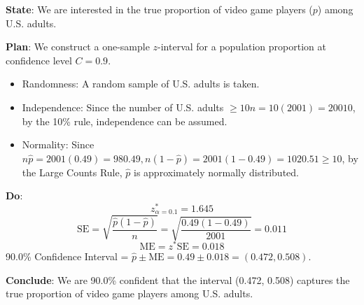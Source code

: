 \documentclass{article}
\begin{document}
\textbf{State}: We are interested in the true proportion of video game players (\(p\)) among U.S. adults.
\newline

\textbf{Plan}: We construct a one-sample \(z\)-interval for a population proportion at confidence level \(C = 0.9\).
\begin{itemize}
\item    Randomness: A random sample of U.S. adults is taken.

\item    Independence: Since the number of U.S. adults \(\geq 10n= 10(2001) = 20010\), by the 10\% rule, independence can be assumed.

\item    Normality: Since \(n\hat{p} = 2001(0.49) = 980.49, n(1-\hat{p}) = 2001(1- 0.49) = 1020.51\geq 10 \), by the Large Counts Rule, \(\hat{p}\) is approximately normally distributed.
\end{itemize}\newline

\textbf{Do}: $$z^*_{\alpha = 0.1} = 1.645$$
$$\textrm{SE} = \sqrt{\frac{\hat{p}(1-\hat{p})}{n}} = \sqrt{\frac{0.49(1 - 0.49)}{2001}} = 0.011$$
$$\textrm{ME} = z^* \textrm{SE} = 0.018$$
90.0\% Confidence Interval = \(\hat{p} \pm \textrm{ME} = 0.49\pm0.018 = (0.472, 0.508)\).\newline

\textbf{Conclude}: We are 90.0\% confident that the interval (0.472, 0.508) captures the true proportion of video game players among U.S. adults.
\end{document}

